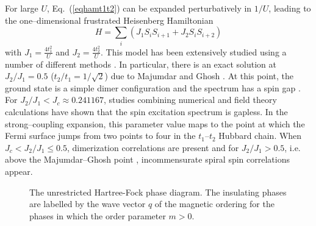 For large $U$, Eq.\ (\ref{eqhamt1t2}) can be expanded perturbatively in
$1/U$, leading to the one--dimensional frustrated
Heisenberg Hamiltonian
\begin{equation}
  H = \sum_i \left( J_1 S_iS_{i+1} + J_2 S_iS_{i+2}  \right)
\end{equation}
with $J_1 = \frac{4t_1^2}{U}$ and $J_2 = \frac{4t_2^2}{U}$.
%
This model has been extensively studied using a number of different
methods \cite{WhiteAffleck}.
In particular, there is an exact solution at $J_2/J_1 = 0.5 $
($t_2/t_1 = 1/\sqrt{2}$) due to Majumdar and Ghosh \cite{MajumdarGhosh}.
At this point, the ground state is a simple dimer configuration and
the spectrum has a spin gap \cite{Affleck88}.
For $J_2/J_1 < J_c \approx 0.241167 $, studies combining numerical 
and field theory calculations \cite{Eggert96} have shown that the spin
excitation spectrum is gapless.
In the strong--coupling expansion,
this parameter value maps to the point at which the Fermi surface
jumps from two points to four in the $t_1$--$t_2$ Hubbard chain.
When $J_c < J_2/J_1 \le 0.5$, dimerization correlations are present and
for $J_2/J_1 > 0.5$, i.e. above the Majumdar--Ghosh point
\cite{MajumdarGhosh}, incommensurate spiral spin correlations appear.


\begin{figure}[htb]
\begin{center}
\end{center}
\caption{The unrestricted Hartree-Fock phase diagram. The insulating phases
are labelled by the wave vector $q$ of the magnetic ordering for the
phases in which the order parameter $m>0$. }
\label{HFPhaseDiag}
\end{figure}

